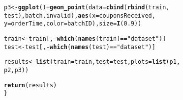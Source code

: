 \documentclass[10pt]{report}
\makeatletter
\newcommand{\hlnum}[1]{\textcolor[rgb]{0.686,0.059,0.569}{#1}}%
\newcommand{\hlstr}[1]{\textcolor[rgb]{0.192,0.494,0.8}{#1}}%
\newcommand{\hlopt}[1]{\textcolor[rgb]{0,0,0}{#1}}%
\newcommand{\hlstd}[1]{\textcolor[rgb]{0.345,0.345,0.345}{#1}}%
\newcommand{\hlkwb}[1]{\textcolor[rgb]{0.69,0.353,0.396}{#1}}%
\newcommand{\hlkwc}[1]{\textcolor[rgb]{0.333,0.667,0.333}{#1}}%
\newcommand{\hlkwd}[1]{\textcolor[rgb]{0.737,0.353,0.396}{\textbf{#1}}}%
\newenvironment{kframe}{%
 \def\at@end@of@kframe{}%
 \ifinner\ifhmode%
  \def\at@end@of@kframe{\end{minipage}}%
  \begin{minipage}{\columnwidth}%
 \fi\fi%
 \def\FrameCommand##1{\hskip\@totalleftmargin \hskip-\fboxsep
 \colorbox{shadecolor}{##1}\hskip-\fboxsep
     \hskip-\linewidth \hskip-\@totalleftmargin \hskip\columnwidth}%
 \MakeFramed {\advance\hsize-\width
   \@totalleftmargin\z@ \linewidth\hsize
   \@setminipage}}%
 {\par\unskip\endMakeFramed%
 \at@end@of@kframe}
\newenvironment{knitrout}{}{} %
\makeatother
\begin{document}
\begin{knitrout}
\begin{kframe}
\begin{alltt}
    \hlstd{p3} \hlkwb{<-} \hlkwd{ggplot}\hlstd{()} \hlopt{+} \hlkwd{geom_point}\hlstd{(}\hlkwc{data} \hlstd{=} \hlkwd{cbind}\hlstd{(}\hlkwd{rbind}\hlstd{(train,}
        \hlstd{test), batch.invalid),} \hlkwd{aes}\hlstd{(}\hlkwc{x} \hlstd{= couponsReceived,}
        \hlkwc{y} \hlstd{= orderTime,} \hlkwc{color} \hlstd{= batchID),} \hlkwc{size} \hlstd{=} \hlkwd{I}\hlstd{(}\hlnum{0.9}\hlstd{))}

    \hlstd{train} \hlkwb{<-} \hlstd{train[,} \hlopt{-}\hlkwd{which}\hlstd{(}\hlkwd{names}\hlstd{(train)} \hlopt{==} \hlstr{"dataset"}\hlstd{)]}
    \hlstd{test} \hlkwb{<-} \hlstd{test[,} \hlopt{-}\hlkwd{which}\hlstd{(}\hlkwd{names}\hlstd{(test)} \hlopt{==} \hlstr{"dataset"}\hlstd{)]}

    \hlstd{results} \hlkwb{<-} \hlkwd{list}\hlstd{(}\hlkwc{train} \hlstd{= train,} \hlkwc{test} \hlstd{= test,} \hlkwc{plots} \hlstd{=} \hlkwd{list}\hlstd{(p1,}
        \hlstd{p2, p3))}

    \hlkwd{return}\hlstd{(results)}
\hlstd{\}}
\end{alltt}
\end{kframe}
\end{knitrout}
\end{document}
